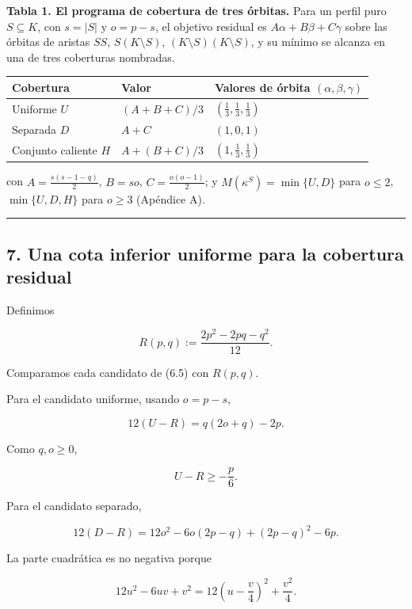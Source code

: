 \documentclass[spanish,11pt,a4paper]{article}
\newcounter{none}
\begin{document}
\textbf{Tabla 1. El programa de cobertura de tres órbitas.} Para un
perfil puro \(S\subseteq K\), con \(s=|S|\) y \(o=p-s\), el objetivo
residual es \(A\alpha+B\beta+C\gamma\) sobre las órbitas de aristas
\(SS\), \(S(K\setminus S)\), \((K\setminus S)(K\setminus S)\), y su
mínimo se alcanza en una de tres coberturas nombradas.

{\def\LTcaptype{none} %
\begin{longtable}[]{@{}lll@{}}
\toprule\noalign{}
Cobertura & Valor & Valores de órbita \((\alpha,\beta,\gamma)\) \\
\midrule\noalign{}
\endhead
\bottomrule\noalign{}
\endlastfoot
Uniforme \(U\) & \((A+B+C)/3\) & \((\tfrac13,\tfrac13,\tfrac13)\) \\
Separada \(D\) & \(A+C\) & \((1,0,1)\) \\
Conjunto caliente \(H\) & \(A+(B+C)/3\) & \((1,\tfrac13,\tfrac13)\) \\
\end{longtable}
}

con \(A=\tfrac{s(s-1-q)}2\), \(B=so\), \(C=\tfrac{o(o-1)}2\); y
\(M(\kappa^S)=\min\{U,D\}\) para \(o\le2\), \(\min\{U,D,H\}\) para
\(o\ge3\) (Apéndice A).

\begin{center}\rule{0.5\linewidth}{0.5pt}\end{center}

\subsection{7. Una cota inferior uniforme para la cobertura
residual}\label{una-cota-inferior-uniforme-para-la-cobertura-residual}

Definimos

\[
R(p,q)
:=
\frac{2p^2-2pq-q^2}{12}.
\tag{7.1}
\]

Comparamos cada candidato de (6.5) con \(R(p,q)\).

Para el candidato uniforme, usando \(o=p-s\),

\[
12(U-R)
=
q(2o+q)-2p.
\tag{7.2}
\]

Como \(q,o\ge0\),

\[
U-R\ge-\frac p6.
\tag{7.3}
\]

Para el candidato separado,

\[
12(D-R)
=
12o^2-6o(2p-q)+(2p-q)^2-6p.
\tag{7.4}
\]

La parte cuadrática es no negativa porque

\[
12u^2-6uv+v^2
=
12\left(u-\frac v4\right)^2+\frac{v^2}{4}.
\]
\end{document}
